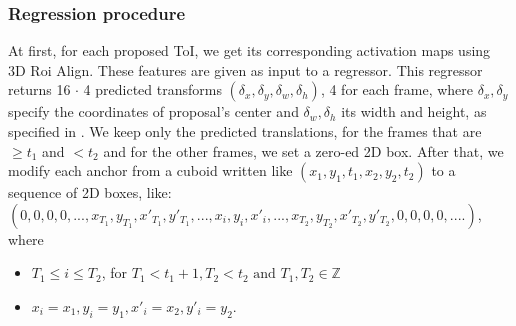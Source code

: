 \subsubsection{Regression procedure}
At first, for each proposed ToI, we get its corresponding activation maps using 3D Roi Align. These features are given as input to a regressor. This regressor returns 16 $\cdot$ 4 predicted
transforms $(\delta_x,\delta_y, \delta_w,\delta_h)$, 4 for each frame, where $ \delta_x, \delta_y$ specify the coordinates of proposal's center and $\delta_w, \delta_h$ its width and height, as specified
in \cite{DBLP:journals/corr/GirshickDDM13}.  We keep only the predicted translations, for the frames that are $\ge t_1$ and $< t_2$ and for the other frames, we set a zero-ed 2D box. 
After that, we modify each anchor from a cuboid written like $(x_1,y_1,t_1, x_2, y_2, t_2)$ to a sequence of 2D boxes, like: \\
$(0,0,0,0, ..., x_{T_1},y_{T_1},x'_{T_1},y'_{T_1}, ... ,x_{i},y_{i},x'_{i}, ..., x_{T_2},y_{T_2},x'_{T_2},y'_{T_2}, 0,0,0,0, ....)$, where
\begin{itemize}
\item $ T_1 \le i \le T_2$, for $T_1 < t_1 + 1,  T_2 < t_2 \text{ and }T_1,T_2 \in \mathbb{Z} $
\item $ x_i = x_1, y_i= y_1, x'_i = x_2, y'_i = y_2 $.
\end{itemize}

